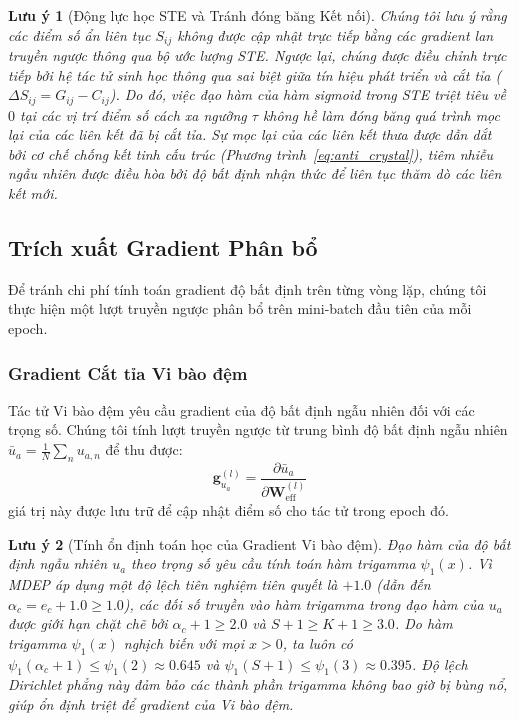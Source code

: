 \documentclass[11pt]{article}
\newtheorem{remark}{Lưu ý}
\begin{document}
\begin{remark}[Động lực học STE và Tránh đóng băng Kết nối]
Chúng tôi lưu ý rằng các điểm số ẩn liên tục $S_{ij}$ không được cập nhật trực tiếp bằng các gradient lan truyền ngược thông qua bộ ước lượng STE. Ngược lại, chúng được điều chỉnh trực tiếp bởi hệ tác tử sinh học thông qua sai biệt giữa tín hiệu phát triển và cắt tỉa ($\Delta S_{ij} = G_{ij} - C_{ij}$). Do đó, việc đạo hàm của hàm sigmoid trong STE triệt tiêu về $0$ tại các vị trí điểm số cách xa ngưỡng $\tau$ không hề làm đóng băng quá trình mọc lại của các liên kết đã bị cắt tỉa. Sự mọc lại của các liên kết thưa được dẫn dắt bởi cơ chế chống kết tinh cấu trúc (Phương trình~\ref{eq:anti_crystal}), tiêm nhiễu ngẫu nhiên được điều hòa bởi độ bất định nhận thức để liên tục thăm dò các liên kết mới.
\end{remark}

\subsection{Trích xuất Gradient Phân bổ}\label{subsec:amortised}

Để tránh chi phí tính toán gradient độ bất định trên từng vòng lặp, chúng tôi thực hiện một lượt truyền ngược phân bổ trên mini-batch đầu tiên của mỗi epoch.

\subsubsection{Gradient Cắt tỉa Vi bào đệm}

Tác tử Vi bào đệm yêu cầu gradient của độ bất định ngẫu nhiên đối với các trọng số. Chúng tôi tính lượt truyền ngược từ trung bình độ bất định ngẫu nhiên $\bar{u}_a = \frac{1}{N}\sum_n u_{a,n}$ để thu được:
\begin{equation}\label{eq:grad_ua}
    \bm{g}_{u_a}^{(l)} = \frac{\partial \bar{u}_a}{\partial \bm{W}_{\text{eff}}^{(l)}}
\end{equation}
giá trị này được lưu trữ để cập nhật điểm số cho tác tử trong epoch đó.

\begin{remark}[Tính ổn định toán học của Gradient Vi bào đệm]
Đạo hàm của độ bất định ngẫu nhiên $u_a$ theo trọng số yêu cầu tính toán hàm trigamma $\psi_1(x)$. Vì MDEP áp dụng một độ lệch tiên nghiệm tiên quyết là $+1.0$ (dẫn đến $\alpha_c = e_c + 1.0 \ge 1.0$), các đối số truyền vào hàm trigamma trong đạo hàm của $u_a$ được giới hạn chặt chẽ bởi $\alpha_c + 1 \ge 2.0$ và $S + 1 \ge K + 1 \ge 3.0$. Do hàm trigamma $\psi_1(x)$ nghịch biến với mọi $x > 0$, ta luôn có $\psi_1(\alpha_c+1) \le \psi_1(2) \approx 0.645$ và $\psi_1(S+1) \le \psi_1(3) \approx 0.395$. Độ lệch Dirichlet phẳng này đảm bảo các thành phần trigamma không bao giờ bị bùng nổ, giúp ổn định triệt để gradient của Vi bào đệm.
\end{remark}
\end{document}
